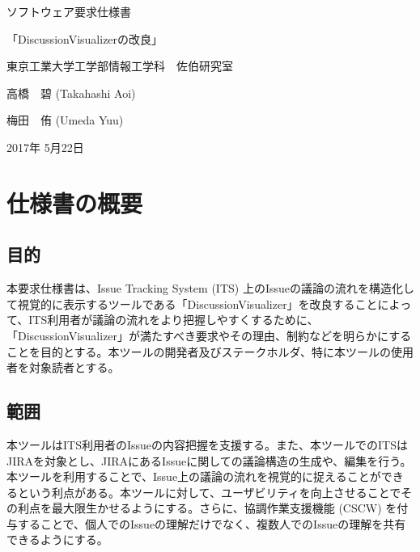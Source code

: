 \documentclass[12pt, oneside]{jreport}
\begin{document}
\begin{center}

{\Huge ソフトウェア要求仕様書}

\vspace{15mm}

{\huge 「DiscussionVisualizerの改良」}

\vspace{30mm}

{\Large 東京工業大学工学部情報工学科　佐伯研究室}

\vspace{10mm}

{\large 高橋　碧 (Takahashi Aoi)}

\vspace{1mm}

{\large 梅田　侑 (Umeda Yuu)}

\vspace{10mm}

{\large 2017年 5月22日}

\end{center}

\newpage 


\tableofcontents
\clearpage



\chapter{仕様書の概要}

	\section{目的}
	本要求仕様書は、Issue Tracking System (ITS) 上のIssueの議論の流れを構造化して視覚的に表示するツールである「DiscussionVisualizer」を改良することによって、ITS利用者が議論の流れをより把握しやすくするために、「DiscussionVisualizer」が満たすべき要求やその理由、制約などを明らかにすることを目的とする。本ツールの開発者及びステークホルダ、特に本ツールの使用者を対象読者とする。
	
	\section{範囲}
	本ツールはITS利用者のIssueの内容把握を支援する。また、本ツールでのITSはJIRAを対象とし、JIRAにあるIssueに関しての議論構造の生成や、編集を行う。本ツールを利用することで、Issue上の議論の流れを視覚的に捉えることができるという利点がある。本ツールに対して、ユーザビリティを向上させることでその利点を最大限生かせるようにする。さらに、協調作業支援機能 (CSCW) を付与することで、個人でのIssueの理解だけでなく、複数人でのIssueの理解を共有できるようにする。
	
\end{document}
